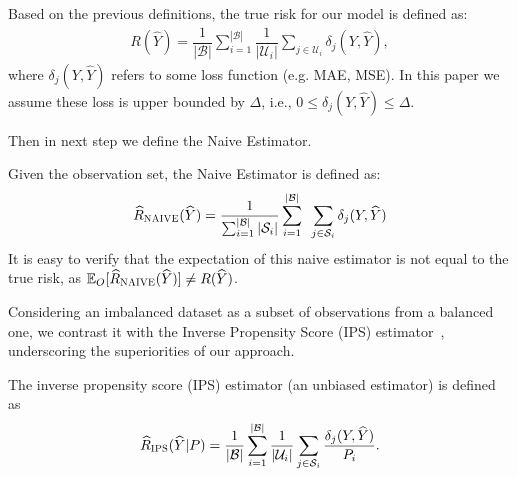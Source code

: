 \begin{definition}
Based on the previous definitions, the true risk for our model is defined as:
%
\begin{align*}
    R(\hat{Y}) = \dfrac{1}{|\mathcal{B}|} \sum_{i=1}^{|\mathcal{B}|} \dfrac{1}{|\mathcal{U}_{i}|} \sum_{j \in \mathcal{U}_{i}} \delta_{j} (Y, \hat{Y}),
\end{align*}
%
where $\delta_{j} (Y, \hat{Y})$ refers to some loss function (e.g. MAE, MSE). In this paper we assume these loss is upper bounded by $\Delta$, i.e., $0 \leq \delta_{j} (Y, \hat{Y}) \leq \Delta$.
\end{definition}
Then in next step we define the Naive Estimator.
\begin{definition}
Given the observation set, the Naive Estimator is defined as:
%
\begin{align*}
    \hat{R}_{\textsc{NAIVE}}(\hat{Y}) = \dfrac{1}{ \sum_{i=1}^{|\mathcal{B}|} |\mathcal{S}_{i}|} \sum_{i=1}^{|\mathcal{B}|} \enspace \sum_{j \in \mathcal{S}_{i}} \delta_{j} (Y, \hat{Y})
\end{align*}
%
It is easy to verify that the expectation of this naive estimator is not equal to the true risk, as $\mathbb{E}_{O} [\hat{R}_{\textsc{NAIVE}}(\hat{Y})] \neq R(\hat{Y})$.
\end{definition}
Considering an imbalanced dataset as a subset of observations from a balanced one, we contrast it with the Inverse Propensity Score (IPS) estimator~\citep{schnabel2016recommendations}, underscoring the superiorities of our approach.
\begin{definition}\label{def:ips_supp}
The inverse propensity score (IPS) estimator (an unbiased estimator) is defined as
%
\begin{align*}
    \hat{R}_{\textsc{IPS}}(\hat{Y} | P) = \dfrac{1}{|\mathcal{B}|} \sum_{i=1}^{|\mathcal{B}|} \dfrac{1}{|\mathcal{U}_{i}|} \sum_{j \in \mathcal{S}_{i}} \dfrac{\delta_{j} (Y, \hat{Y})}{P_{i}}.
\end{align*}
\end{definition}


